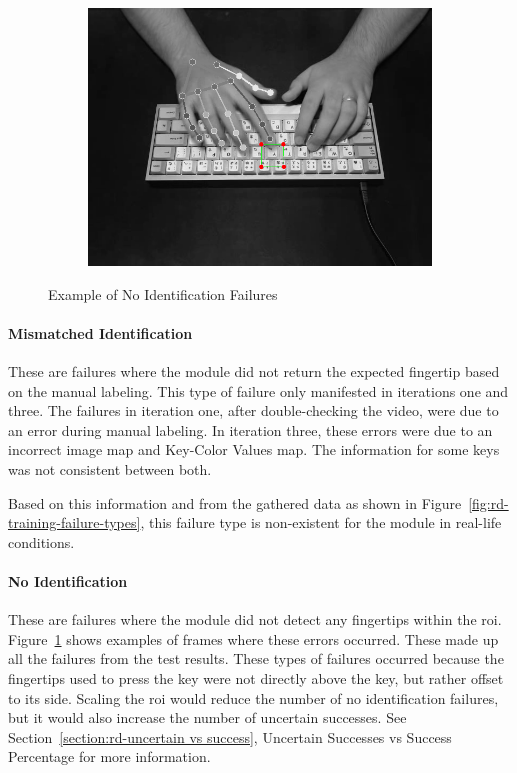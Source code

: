 \documentclass{report}
\begin{document}
\begin{figure}[H]
\begin{subfigure}{.5\textwidth}
		\includegraphics[width=.995\linewidth]{failure-2.png}
	\end{subfigure}
	\caption{Example of No Identification Failures}
	\label{fig:rd-training-sample}
\end{figure}

\paragraph{Mismatched Identification}
These are failures where the module did not return the expected fingertip based
on the manual labeling. This type of failure only manifested in iterations one
and three. The failures in iteration one, after double-checking the video, were
due to an error during manual labeling. In iteration three, these errors were
due to an incorrect image map and Key-Color Values map. The information for some
keys was not consistent between both.

Based on this information and from the gathered data as shown in
Figure~\ref{fig:rd-training-failure-types}, this failure type is non-existent
for the module in real-life conditions.

\paragraph{No Identification}
These are failures where the module did not detect any fingertips within the
\ac{roi}. Figure~\ref{fig:rd-training-sample} shows examples of frames where
these errors occurred. These made up all the failures from the test results.
These types of failures occurred because the fingertips used to press the key
were not directly above the key, but rather offset to its side. Scaling the
\ac{roi} would reduce the number of no identification failures, but it would
also increase the number of uncertain successes. See
Section~\ref{section:rd-uncertain vs success}, Uncertain Successes vs Success
Percentage for more information.
\end{document}
